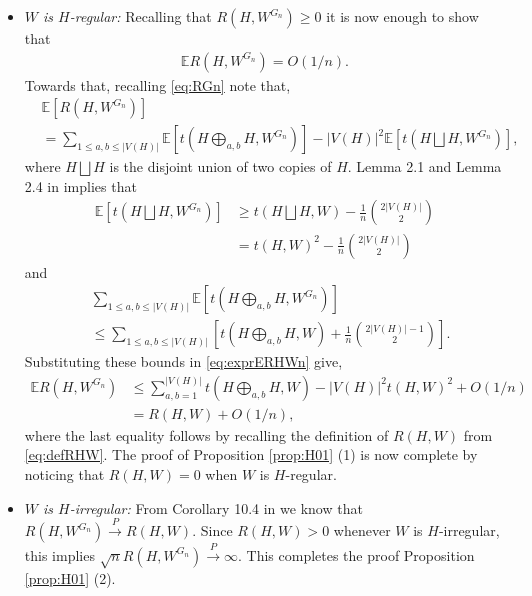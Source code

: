 \documentclass[11pt,reqno]{amsart}
\numberwithin{equation}{section}
\newcommand{\E}{\mathbb{E}}
\theoremstyle{definition}
\begin{document}
\begin{itemize} 

\item \textit{$W$ is $H$-regular:} Recalling that $R(H,W^{G_{n}})\geq 0$ it is now enough to show that 
\begin{align}\label{eq:RHGnexpectation}
\mathbb{E}R(H,W^{G_{n}})=O(1/n).
\end{align}
Towards that, recalling \eqref{eq:RGn} note that,
\begin{align}\label{eq:exprERHWn}
    & \E\left[R(H,W^{G_{n}})\right] \nonumber \\ 
    & = \sum_{ 1 \leq a,b \leq |V(H)| }\E\left[t\left(H\bigoplus_{a,b}H,W^{G_{n}}\right)\right]-|V(H)|^2\E\left[t(H \bigsqcup H,W^{G_{n}})\right] , 
\end{align}
where $H \bigsqcup H$ is the disjoint union of two copies of $H$. Lemma 2.1 and Lemma 2.4 in \cite{lovasz2006limits} implies that 
\begin{align*}
	\mathbb{E}\left[t(H \bigsqcup H,W^{G_{n}})\right]
	&\geq t(H \bigsqcup H,W)-\frac{1}{n}{2|V(H)|\choose 2} \nonumber \\ 
	& =t(H,W)^{2}-\frac{1}{n}{2|V(H)|\choose 2}
\end{align*}
and 
\begin{align*}
	& \sum_{ 1 \leq a,b \leq |V(H)| }\mathbb{E}\left[t\left(H\bigoplus_{a,b}H,W^{G_{n}}\right)\right] \nonumber \\ 
	& \leq \sum_{ 1 \leq a,b \leq |V(H)| }\left[t\left(H\bigoplus_{a,b}H,W\right)+\frac{1}{n}{2|V(H)|-1\choose 2}\right] .
\end{align*}
Substituting these bounds in \eqref{eq:exprERHWn} give, 
\begin{align*}
	\mathbb{E}R(H,W^{G_{n}})
	&\leq \sum_{a,b=1}^{|V(H)|}t\left(H\bigoplus_{a,b}H,W\right)-|V(H)|^2t(H,W)^2 + O(1/n)\\
    & = R(H,W) + O(1/n) , 
\end{align*}
where the last equality follows by recalling the definition of $R(H,W)$ from \eqref{eq:defRHW}. The proof of Proposition \ref{prop:H01} (1) is now complete by noticing that $R(H,W) = 0$ when $W$ is $H$-regular. 

\item \textit{$W$ is $H$-irregular:} From Corollary 10.4 in \cite{lovasz2012large} we know that $R(H,W^{G_{n}}) \overset{P}{\rightarrow} R(H,W)$. Since $R(H,W)>0$ whenever $W$ is $H$-irregular, this implies $\sqrt{n}R(H,W^{G_n})\overset{P}{\rightarrow}\infty$. This completes the proof Proposition \ref{prop:H01} (2). 
\end{itemize}
\end{document}
